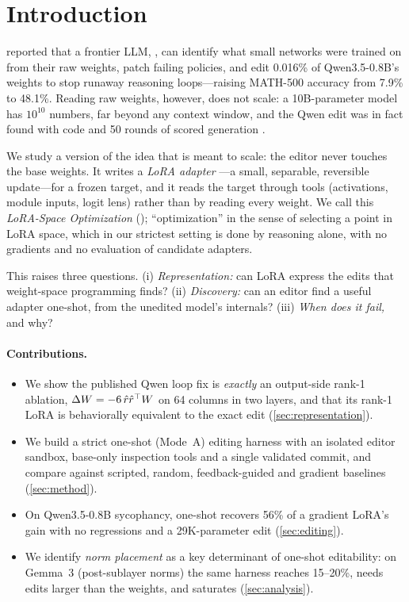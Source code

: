 \section{Introduction}
\label{sec:intro}

\citet{takehi2026wsp} reported that a frontier LLM, \astra{}, can identify what small networks were trained on from
their raw weights, patch failing policies, and edit 0.016\% of Qwen3.5-0.8B's weights to stop runaway reasoning
loops---raising MATH-500 accuracy from 7.9\% to 48.1\%. Reading raw weights, however, does not scale: a 10B-parameter
model has $10^{10}$ numbers, far beyond any context window, and the Qwen edit was in fact found with code and 50
rounds of scored generation \citep{takehi2026logs}.

We study a version of the idea that is meant to scale: the editor never touches the base weights. It writes a
\emph{LoRA adapter} \citep{hu2022lora}---a small, separable, reversible update---for a frozen target, and it reads the
target through tools (activations, module inputs, logit lens) rather than by reading every weight. We call this
\emph{LoRA-Space Optimization} (\lso{}); ``optimization'' in the sense of selecting a point in LoRA space, which in our
strictest setting is done by reasoning alone, with no gradients and no evaluation of candidate adapters.

This raises three questions. (i) \emph{Representation:} can LoRA express the edits that weight-space programming
finds? (ii) \emph{Discovery:} can an editor find a useful adapter one-shot, from the unedited model's internals?
(iii) \emph{When does it fail,} and why?

\paragraph{Contributions.}
\begin{itemize}[leftmargin=*,itemsep=2pt]
  \item We show the published Qwen loop fix is \emph{exactly} an output-side rank-1 ablation,
        $\Delta W=-6\,\hat{r}\hat{r}^{\top}W$ on 64 columns in two layers, and that its rank-1 LoRA is behaviorally
        equivalent to the exact edit (\cref{sec:representation}).
  \item We build a strict one-shot (Mode~A) editing harness with an isolated editor sandbox, base-only inspection
        tools and a single validated commit, and compare against scripted, random, feedback-guided and gradient
        baselines (\cref{sec:method}).
  \item On Qwen3.5-0.8B sycophancy, one-shot \astra{} recovers 56\% of a gradient LoRA's gain with no regressions
        and a 29K-parameter edit (\cref{sec:editing}). 
  \item We identify \emph{norm placement} as a key determinant of one-shot editability: on Gemma~3 (post-sublayer
        norms) the same harness reaches 15--20\%, needs edits larger than the weights, and saturates
        (\cref{sec:analysis}).
\end{itemize}
